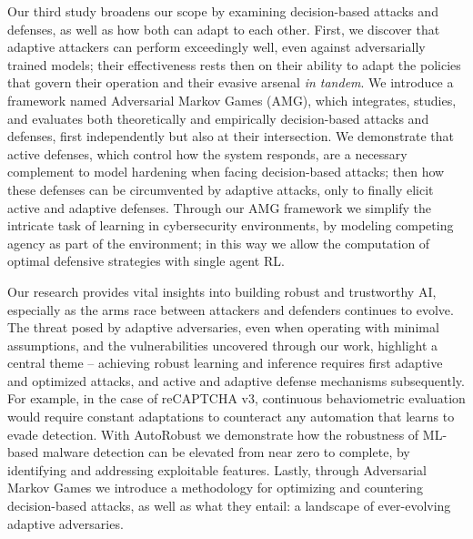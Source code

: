 Our third study broadens our scope by examining decision-based attacks and defenses, as well as how both can adapt to each other.
First, we discover that adaptive attackers can perform exceedingly well, even against adversarially trained models; their effectiveness rests then on their ability to adapt the policies that govern their operation and their evasive arsenal \textit{in tandem}.
We introduce a framework named Adversarial Markov Games (AMG), which integrates, studies, and evaluates both theoretically and empirically decision-based attacks and defenses, first independently but also at their intersection.
We demonstrate that active defenses, which control how the system responds, are a necessary complement to model hardening when facing decision-based attacks; then how these defenses can be circumvented by adaptive attacks, only to finally elicit active and adaptive defenses.
Through our AMG framework we simplify the intricate task of learning in cybersecurity environments, by modeling competing agency as part of the environment; in this way we allow the computation of optimal defensive strategies with single agent \gls{RL}.

Our research provides vital insights into building robust and trustworthy \gls{AI}, especially as the arms race between attackers and defenders continues to evolve.
The threat posed by adaptive adversaries, even when operating with minimal assumptions, and the vulnerabilities uncovered through our work, highlight a central theme -- achieving robust learning and inference requires first adaptive and optimized attacks, and active and adaptive defense mechanisms subsequently.
For example, in the case of reCAPTCHA v3, continuous behaviometric evaluation would require constant adaptations to counteract any automation that learns to evade detection.
With AutoRobust we demonstrate how the robustness of ML-based malware detection can be elevated from near zero to complete, by identifying and addressing exploitable features.
Lastly, through Adversarial Markov Games we introduce a methodology for optimizing and countering decision-based attacks, as well as what they entail: a landscape of ever-evolving adaptive adversaries.

